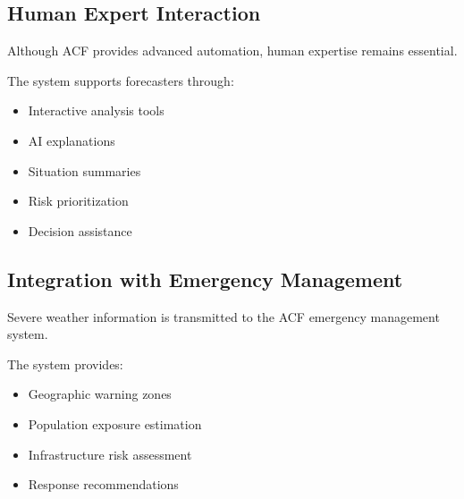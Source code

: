 
\subsection{Human Expert Interaction}

Although ACF provides advanced automation, human expertise remains
essential.

The system supports forecasters through:

\begin{itemize}

\item Interactive analysis tools

\item AI explanations

\item Situation summaries

\item Risk prioritization

\item Decision assistance

\end{itemize}



\subsection{Integration with Emergency Management}

Severe weather information is transmitted to the ACF emergency
management system.

The system provides:

\begin{itemize}

\item Geographic warning zones

\item Population exposure estimation

\item Infrastructure risk assessment

\item Response recommendations

\end{itemize}




